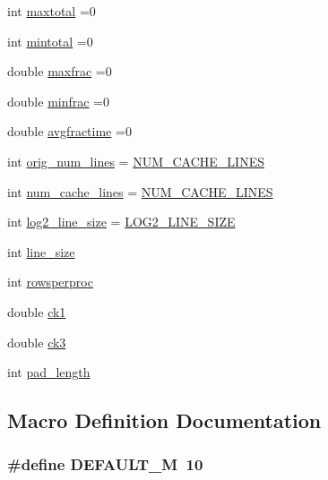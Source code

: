 \begin{DoxyCompactItemize}
\item 
int \hyperlink{fft_8C_abaacc1b51e77ad76d3bd569c6a761b50}{maxtotal} =0
\item 
int \hyperlink{fft_8C_ae4ea09b43e337f76159fd601ec785bcf}{mintotal} =0
\item 
double \hyperlink{fft_8C_acff78ed4dd1ec7c0054655fe1ff24e86}{maxfrac} =0
\item 
double \hyperlink{fft_8C_adae7fdc068d0cda31e7c82201018d2cb}{minfrac} =0
\item 
double \hyperlink{fft_8C_a73bf764204b57c2a18707075fac2b429}{avgfractime} =0
\item 
int \hyperlink{fft_8C_ae058fc3d0cfa8f930eb88082726ccf56}{orig\+\_\+num\+\_\+lines} = \hyperlink{fft_8C_a1cf55e02cd2f0edd18a270fa33314670}{N\+U\+M\+\_\+\+C\+A\+C\+H\+E\+\_\+\+L\+I\+N\+E\+S}
\item 
int \hyperlink{fft_8C_aef98a866941663b863e741a502880efc}{num\+\_\+cache\+\_\+lines} = \hyperlink{fft_8C_a1cf55e02cd2f0edd18a270fa33314670}{N\+U\+M\+\_\+\+C\+A\+C\+H\+E\+\_\+\+L\+I\+N\+E\+S}
\item 
int \hyperlink{fft_8C_afdcaa2ef4ede55618f5ff6d5aa53dac6}{log2\+\_\+line\+\_\+size} = \hyperlink{fft_8C_a05cb055f4f0f37b23d5697a5af1daa72}{L\+O\+G2\+\_\+\+L\+I\+N\+E\+\_\+\+S\+I\+Z\+E}
\item 
int \hyperlink{fft_8C_a43a1d2286bbb11edc0c83ec8588dd81d}{line\+\_\+size}
\item 
int \hyperlink{fft_8C_acaaf880fc407fd07db5ee76b758c2078}{rowsperproc}
\item 
double \hyperlink{fft_8C_a29c72e1e55faf8ac079cacc4df9174d9}{ck1}
\item 
double \hyperlink{fft_8C_af5fea8947cca950bbb397c49007717db}{ck3}
\item 
int \hyperlink{fft_8C_a3d0e20892ce2302560522400f5b5da17}{pad\+\_\+length}
\end{DoxyCompactItemize}


\subsection{Macro Definition Documentation}
\hypertarget{fft_8C_a383f5d92772af0967bbc18d6cac778a2}{}
\subsubsection[{D\+E\+F\+A\+U\+L\+T\+\_\+\+M}]{\setlength{\rightskip}{0pt plus 5cm}\#define D\+E\+F\+A\+U\+L\+T\+\_\+\+M~10}\label{fft_8C_a383f5d92772af0967bbc18d6cac778a2}
\hypertarget{fft_8C_a5ef8f72e91130f2eaa3a1308437323c3}{}
